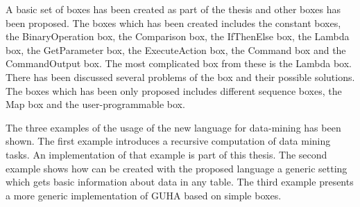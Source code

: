 \documentclass[a4paper,12pt]{book}
\begin{document}
A basic set of boxes has been created as part of the thesis and other boxes has been proposed. The boxes which has been created includes the constant boxes, the BinaryOperation box, the Comparison box, the IfThenElse box, the Lambda box, the GetParameter box, the ExecuteAction box, the Command box and the CommandOutput box. The most complicated box from these is the Lambda box. There has been discussed several problems of the box and their possible solutions. The boxes which has been only proposed includes different sequence boxes, the Map box and the user-programmable box.

The three examples of the usage of the new language for data-mining has been shown. The first example introduces a recursive computation of data mining tasks. An implementation of that example is part of this thesis. The second example shows how can be created with the proposed language a generic setting which gets basic information about data in any table. The third example presents a more generic implementation of GUHA based on simple boxes.



%
%

%




\end{document}
